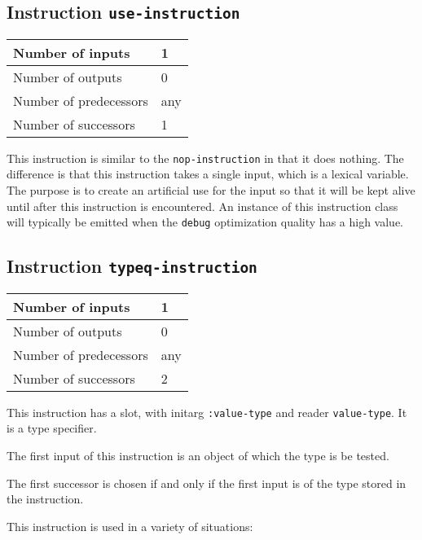 \subsection{Instruction \texttt{use-instruction}}
\label{hir-instruction-use}

\begin{tabular}{|l|l|}
\hline
Number of inputs &  1\\
\hline
Number of outputs & 0\\
\hline
Number of predecessors & any\\
\hline
Number of successors & 1\\
\hline
\end{tabular}

This instruction is similar to the \texttt{nop-instruction} in that it
does nothing.  The difference is that this instruction takes a single
input, which is a lexical variable.  The purpose is to create an
artificial use for the input so that it will be kept alive until after
this instruction is encountered.  An instance of this instruction
class will typically be emitted when the \texttt{debug} optimization
quality has a high value.

\subsection{Instruction \texttt{typeq-instruction}}
\label{hir-instruction-typeq}

\begin{tabular}{|l|l|}
\hline
Number of inputs & 1\\
\hline
Number of outputs & 0\\
\hline
Number of predecessors & any\\
\hline
Number of successors & 2\\
\hline
\end{tabular}

This instruction has a slot, with initarg \texttt{:value-type} and
reader \texttt{value-type}. It is a \commonlisp{} type specifier.

The first input of this instruction is an object of which the type
is be tested.

The first successor is chosen if and only if the first input is of
the type stored in the instruction.

This instruction is used in a variety of situations:

